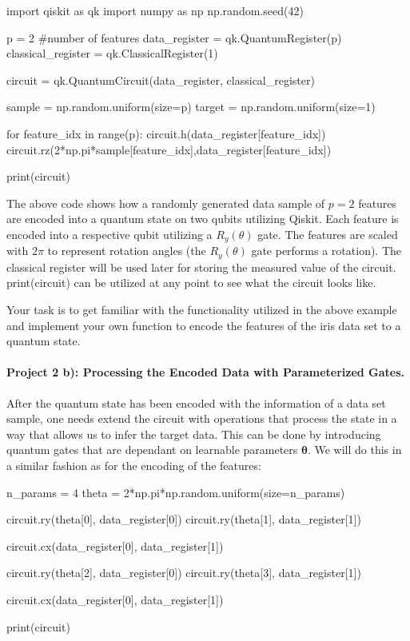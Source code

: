 \documentclass[%
oneside,                 %
final,                   %
10pt]{article}
\begin{document}
\begin{print}
import qiskit as qk
import numpy as np
np.random.seed(42)

p = 2 #number of features
data_register = qk.QuantumRegister(p)
classical_register = qk.ClassicalRegister(1)

circuit = qk.QuantumCircuit(data_register, classical_register)

sample = np.random.uniform(size=p)
target = np.random.uniform(size=1)

for feature_idx in range(p):
    circuit.h(data_register[feature_idx])
    circuit.rz(2*np.pi*sample[feature_idx],data_register[feature_idx])

print(circuit)
\end{print}

The above code shows how a randomly generated data sample of $p=2$
features are encoded into a quantum state on two qubits utilizing
Qiskit. Each feature is encoded into a respective qubit utilizing a
$R_y(\theta)$ gate. The features are scaled with $2\pi$ to represent
rotation angles (the $R_y(\theta)$ gate performs a rotation). The
classical register will be used later for storing the measured value
of the circuit.  print(circuit) can be utilized at any point to see
what the circuit looks like.



Your task is to get familiar with the functionality utilized in the
above example and implement your own function to encode the
features of the iris data set to a quantum state.


\paragraph{Project 2 b): Processing the Encoded Data with Parameterized Gates.}
After the quantum state has been encoded with the information of a data set sample, one needs extend the circuit with operations that process the state in a way that allows us to infer the target data. This can be done by introducing quantum gates that are dependant on learnable parameters $\boldsymbol{\theta}$. We will do this in a similar fashion as for the encoding of the features:

\begin{print}
n_params = 4
theta = 2*np.pi*np.random.uniform(size=n_params)

circuit.ry(theta[0], data_register[0])
circuit.ry(theta[1], data_register[1])

circuit.cx(data_register[0], data_register[1])

circuit.ry(theta[2], data_register[0])
circuit.ry(theta[3], data_register[1])

circuit.cx(data_register[0], data_register[1])

print(circuit)
\end{print}
\end{document}

